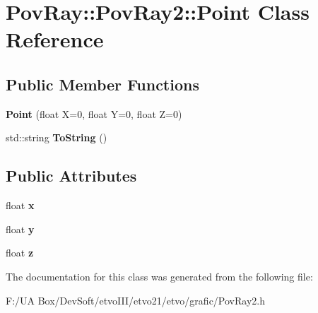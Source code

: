 \section{Pov\+Ray\+:\+:Pov\+Ray2\+:\+:Point Class Reference}
\label{class_pov_ray_1_1_pov_ray2_1_1_point}
\subsection*{Public Member Functions}
\begin{DoxyCompactItemize}
\item 
\mbox{\label{class_pov_ray_1_1_pov_ray2_1_1_point_aaad775e15b0968f3a4b8991aa1c67c77}} 
{\bfseries Point} (float X=0, float Y=0, float Z=0)
\item 
\mbox{\label{class_pov_ray_1_1_pov_ray2_1_1_point_aab7b20ba9e713159f1f54f0685a64a42}} 
std\+::string {\bfseries To\+String} ()
\end{DoxyCompactItemize}
\subsection*{Public Attributes}
\begin{DoxyCompactItemize}
\item 
\mbox{\label{class_pov_ray_1_1_pov_ray2_1_1_point_ae263d2db95131761a3210715e5a2c4f5}} 
float {\bfseries x}
\item 
\mbox{\label{class_pov_ray_1_1_pov_ray2_1_1_point_affc0692adeada35a2c4578bad78ae8e1}} 
float {\bfseries y}
\item 
\mbox{\label{class_pov_ray_1_1_pov_ray2_1_1_point_ad5362439150ce1146f38a0bd847a3584}} 
float {\bfseries z}
\end{DoxyCompactItemize}


The documentation for this class was generated from the following file\+:\begin{DoxyCompactItemize}
\item 
F\+:/\+U\+A Box/\+Dev\+Soft/etvo\+I\+I\+I/etvo21/etvo/grafic/Pov\+Ray2.\+h\end{DoxyCompactItemize}
